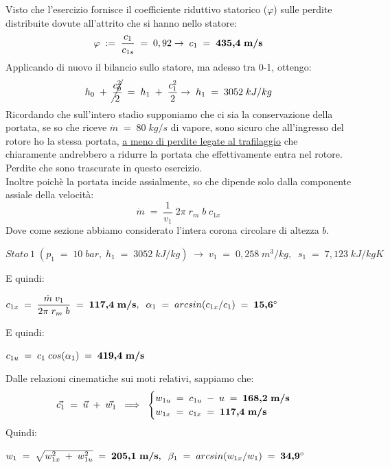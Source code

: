 \documentclass[a4paper, twoside, 12pt]{report}
\begin{document}
Visto che l'esercizio fornisce il coefficiente riduttivo statorico ($\varphi$) sulle perdite distribuite dovute all'attrito che si hanno nello statore:
\begin{equation}
	\varphi\;:=\;\dfrac{c_{1}}{c_{1s}}\;=\;0,92\to\;c_{1}\;=\;\textbf{435,4\;m/s}
\end{equation}
Applicando di nuovo il bilancio sullo statore, ma adesso tra 0-1, ottengo:
\begin{equation}
	h_{0}\;+\;\cancel{\dfrac{c_{0}^{2}}{2}}\:=\;h_{1}\;+\;\dfrac{c_{1}^{2}}{2}\to\;h_{1}\;=\;3052\;kJ/kg
\end{equation}
Ricordando che sull'intero stadio supponiamo che ci sia la conservazione della portata, se so che riceve $\dot{m}\;=\;80\;kg/s$ di vapore, sono sicuro che all'ingresso del rotore ho la stessa portata, \uline{a meno di perdite legate al trafilaggio} che chiaramente andrebbero a ridurre la portata che effettivamente entra nel rotore. Perdite che sono trascurate in questo esercizio.\\
Inoltre poichè la portata incide assialmente, so che dipende solo dalla componente assiale della velocità:
\begin{equation}
	\dot{m}\;=\;\dfrac{1}{v_{1}}\;2\pi\;r_{m}\;b\;c_{1x}
\end{equation}
Dove come sezione abbiamo considerato l'intera corona circolare di altezza $b$.
\begin{center}
	$Stato\:1\;(p_{1}\;=\;10\;bar,\;h_{1}\;=\;3052\;kJ/kg)\;\to\;v_{1}\;=\;0,258\;m^{3}/kg,\;\;s_{1}\;=\;7,123\;kJ/kgK$
\end{center}
E quindi:
\begin{center}
	$c_{1x}\;=\;\dfrac{\dot{m}\;v_{1}}{2\pi\;r_{m}\;b}\;=\;\textbf{117,4\;m/s},\;\;\alpha_{1}\;=\;arcsin(c_{1x}/c_{1})\;=\;\textbf{15,6$^{\circ}$}$
\end{center}
E quindi:
\begin{center}
	$c_{1u}\;=\;c_{1}\;cos(\alpha_{1})\;=\;\textbf{419,4\;m/s}$
\end{center}
Dalle relazioni cinematiche sui moti relativi, sappiamo che:
\begin{equation}
	\vec{c_{1}}\;=\;\vec{u}\;+\;\vec{w_{1}}\;\implies\;\begin{cases}
											   	           w_{1u}\;=\;c_{1u}\;-\;u\;=\;\textbf{168,2\;m/s}\\
											               	w_{1x}\;=\;c_{1x}\;=\;\textbf{117,4\;m/s}
	                                                   \end{cases}
\end{equation}
Quindi:
\begin{center}
	$w_{1}\;=\;\sqrt{w_{1x}^{2}\;+\;w_{1u}^{2}}\;=\;\textbf{205,1\;m/s},\;\;\beta_{1}\;=\;arcsin(w_{1x}/w_{1})\;=\;\textbf{34,9$^{\circ}$}$
\end{center}
\newpage
\end{document}
